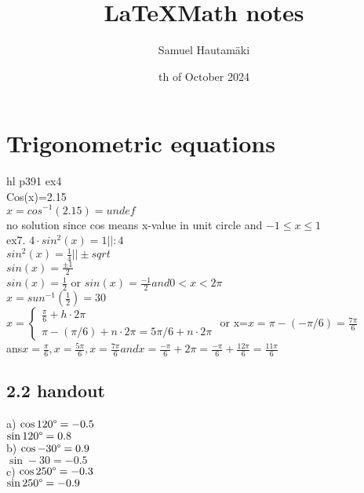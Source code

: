 \documentclass{article}
\title{\LaTeX Math notes}
\author{Samuel Hautamäki}
\date{th of October 2024}
\begin{document}
  \maketitle
  
  \section{Trigonometric equations}
  hl p391 ex4\\
  Cos(x)=2.15\\
  $x=cos^{-1}(2.15)=undef$ \\
  no solution since cos means x-value in unit circle and $-1 \leq x \leq 1$\\
  ex7. $4\cdot sin^2(x)=1 ||:4$ \\
  $sin^2(x)=\frac{1}{4} ||\pm sqrt$\\
  $sin(x)=\frac{\pm1}{2}$ \\
  $sin(x)=\frac{1}{2}$ or $sin(x)=\frac{-1}{2} and 0<x<2\pi$\\
  $x=sun^{-1}(\frac{1}{2})=30$\\
  $x= \begin{cases}
  \frac{\pi}{6}+h\cdot 2 \pi \\
  \pi -(\pi /6)+n\cdot 2 \pi=5 \pi /6 +n\cdot 2\pi  
  \end{cases}$ or x=$x=\pi-(-\pi/6)=\frac{7\pi}{6}$\\
  ans$x=\frac{\pi}{6},x=\frac{5 \pi }{6}, x=\frac{7\pi}{6} and x=\frac{-\pi}{6}+2\pi=\frac{-\pi}{6}+\frac{12\pi}{6}=\frac{11\pi}{6}$

  \subsection{2.2 handout}
  a) $\cos 120\degree =-0.5$\\
  $\sin 120\degree=0.8$\\
  b) $\cos -30\degree=0.9$\\
  $\sin -30=-0.5$\\
  c) $\cos 250\degree=-0.3$\\
  $\sin 250\degree=-0.9$\\
\end{document}
